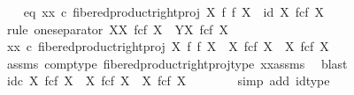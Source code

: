 \begin{isabellebody}
\isanewline
\ \ \isamarkupfalse%
\ eq{}{\isacharcolon}{\kern0pt}\ {\isachardoublequoteopen}xx\ {\isasymcirc}\isactrlsub c\ fibered{\isacharunderscore}{\kern0pt}product{\isacharunderscore}{\kern0pt}right{\isacharunderscore}{\kern0pt}proj\ X\ f\ f\ X\ {\isacharequal}{\kern0pt}\ id\ {\isacharparenleft}{\kern0pt}X\ \isactrlbsub f\isactrlesub {\isasymtimes}\isactrlsub c\isactrlbsub f\isactrlesub \ X{\isacharparenright}{\kern0pt}{\isachardoublequoteclose}\isanewline
\ \ \isamarkupfalse%
\ {\isacharparenleft}{\kern0pt}rule\ one{\isacharunderscore}{\kern0pt}separator{\isacharbrackleft}{\kern0pt}\ X{\isacharequal}{\kern0pt}{\isachardoublequoteopen}X\ \isactrlbsub f\isactrlesub {\isasymtimes}\isactrlsub c\isactrlbsub f\isactrlesub \ X{\isachardoublequoteclose}{\isacharcomma}{\kern0pt}\ \ Y{\isacharequal}{\kern0pt}{\isachardoublequoteopen}X\ \isactrlbsub f\isactrlesub {\isasymtimes}\isactrlsub c\isactrlbsub f\isactrlesub \ X{\isachardoublequoteclose}{\isacharbrackright}{\kern0pt}{\isacharparenright}{\kern0pt}\isanewline
\ \ \ \ \isamarkupfalse%
\ {\isachardoublequoteopen}xx\ {\isasymcirc}\isactrlsub c\ fibered{\isacharunderscore}{\kern0pt}product{\isacharunderscore}{\kern0pt}right{\isacharunderscore}{\kern0pt}proj\ X\ f\ f\ X\ {\isacharcolon}{\kern0pt}\ X\ \isactrlbsub f\isactrlesub {\isasymtimes}\isactrlsub c\isactrlbsub f\isactrlesub \ X\ {\isasymrightarrow}\ X\ \isactrlbsub f\isactrlesub {\isasymtimes}\isactrlsub c\isactrlbsub f\isactrlesub \ X{\isachardoublequoteclose}\isanewline
\ \ \ \ \ \ \isamarkupfalse%
\ assms{\isacharparenleft}{\kern0pt}{}{\isacharparenright}{\kern0pt}\ comp{\isacharunderscore}{\kern0pt}type\ fibered{\isacharunderscore}{\kern0pt}product{\isacharunderscore}{\kern0pt}right{\isacharunderscore}{\kern0pt}proj{\isacharunderscore}{\kern0pt}type\ xx{\isacharunderscore}{\kern0pt}assms\ \isamarkupfalse%
\ blast\isanewline
\ \ \ \ \isamarkupfalse%
\ {\isachardoublequoteopen}id\isactrlsub c\ {\isacharparenleft}{\kern0pt}X\ \isactrlbsub f\isactrlesub {\isasymtimes}\isactrlsub c\isactrlbsub f\isactrlesub \ X{\isacharparenright}{\kern0pt}\ {\isacharcolon}{\kern0pt}\ X\ \isactrlbsub f\isactrlesub {\isasymtimes}\isactrlsub c\isactrlbsub f\isactrlesub \ X\ {\isasymrightarrow}\ X\ \isactrlbsub f\isactrlesub {\isasymtimes}\isactrlsub c\isactrlbsub f\isactrlesub \ X{\isachardoublequoteclose}\isanewline
\ \ \ \ \ \ \isamarkupfalse%
\ {\isacharparenleft}{\kern0pt}simp\ add{\isacharcolon}{\kern0pt}\ id{\isacharunderscore}{\kern0pt}type{\isacharparenright}{\kern0pt}\isanewline

\end{isabellebody}
